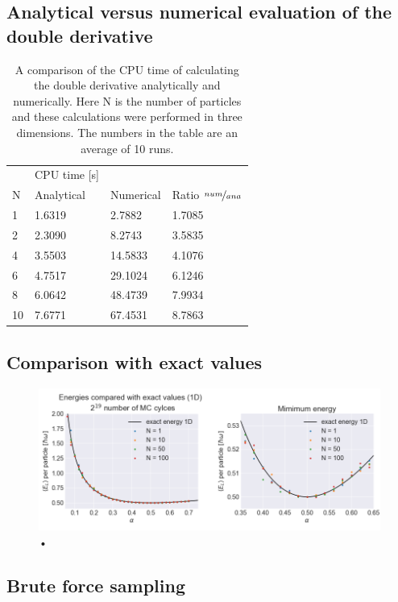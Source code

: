  \subsection{Analytical versus numerical evaluation of the double derivative}
 
\begin{table}[H]\caption{A comparison of the CPU time of calculating the double derivative analytically and numerically. Here N is the number of particles and these calculations were performed in three dimensions. The numbers in the table are an average of 10 runs.}
\center
\begin{tabular}{l|ll|l}
& CPU time [s]&\\
N & Analytical & Numerical & Ratio $\nicefrac{num}{ana}$\\ \hline
1 & 1.6319 & 2.7882 & 1.7085\\
2 & 2.3090 & 8.2743 & 3.5835\\
4 & 3.5503 & 14.5833 & 4.1076\\
6 & 4.7517 & 29.1024 & 6.1246\\
8 & 6.0642 & 48.4739 & 7.9934\\
10 & 7.6771 & 67.4531 & 8.7863\\
\end{tabular}
\end{table}

\subsection{Comparison with exact values}

\begin{figure}[H]
\center
\includegraphics[width=\linewidth]{../Results/comparing_with_exact_1D}\caption{•}\label{fig:exact_comparison_1D}
\end{figure}


 \subsection{Brute force sampling}
 
